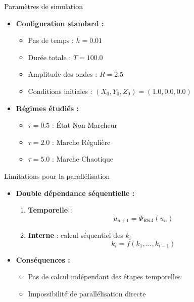\begin{frame}{Paramètres de simulation}
    \begin{itemize}
        \item \textbf{Configuration standard :}
        \begin{itemize}
            \item Pas de temps : $h = 0.01$
            \item Durée totale : $T = 100.0$
            \item Amplitude des ondes : $R = 2.5$
            \item Conditions initiales : $(X_0, Y_0, Z_0) = (1.0, 0.0, 0.0)$
        \end{itemize}
        \vspace{0.3cm}
        \item \textbf{Régimes étudiés :}
        \begin{itemize}
            \item $\tau = 0.5$ : État Non-Marcheur
            \item $\tau = 2.0$ : Marche Régulière
            \item $\tau = 5.0$ : Marche Chaotique
        \end{itemize}
    \end{itemize}
\end{frame}

\begin{frame}{Limitations pour la parallélisation}
    \begin{itemize}
        \item \textbf{Double dépendance séquentielle :}
        \begin{enumerate}
            \item \textbf{Temporelle} : 
            \begin{equation*}
                u_{n+1} = \Phi_{\text{RK4}}(u_n)
            \end{equation*}
            \item \textbf{Interne} : calcul séquentiel des $k_i$
            \begin{equation*}
                k_i = f(k_1, \ldots, k_{i-1})
            \end{equation*}
        \end{enumerate}
        \vspace{0.3cm}
        \item \textbf{Conséquences :}
        \begin{itemize}
            \item Pas de calcul indépendant des étapes temporelles
            \item Impossibilité de parallélisation directe
        \end{itemize}
    \end{itemize}
\end{frame}